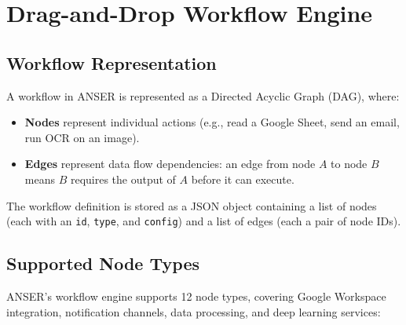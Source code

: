 \documentclass[11pt,a4paper]{report}
\begin{document}
\section{Drag-and-Drop Workflow Engine}
\label{sec:workflow-engine}

\subsection{Workflow Representation}

A workflow in ANSER is represented as a Directed Acyclic Graph (DAG), where:
\begin{itemize}
  \item \textbf{Nodes} represent individual actions (e.g., read a Google Sheet, send an email, run OCR on an image).
  \item \textbf{Edges} represent data flow dependencies: an edge from node $A$ to node $B$ means $B$ requires the output of $A$ before it can execute.
\end{itemize}

The workflow definition is stored as a JSON object containing a list of nodes (each with an \texttt{id}, \texttt{type}, and \texttt{config}) and a list of edges (each a pair of node IDs).

\subsection{Supported Node Types}

ANSER's workflow engine supports 12 node types, covering Google Workspace integration, notification channels, data processing, and deep learning services:
\end{document}
